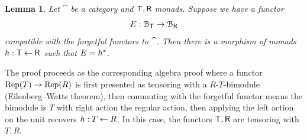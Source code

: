\documentclass[a4paper, reqno]{amsart}
\newtheorem{lemma}[theorem]{Lemma}
\theoremstyle{introTheorems}
\newcommand\Rep{\textup{Rep}}
\renewcommand{\1}{\mathbbold{1}}
\begin{document}
\begin{lemma}\label{lm_monadRestriction}
Let $\cat$ be a category and ${\mathsf{T}},{\mathsf{R}}$ monads. Suppose we have a functor
$$E: \mathcal{B}_{\mathsf{T}}\to \mathcal{B}_{\mathsf{R}}$$
compatible with the forgetful functors to $\cat$. Then there is a morphism of monads $h:{\mathsf{T}}\leftarrow {\mathsf{R}}$ such that $E=h^*$.
\end{lemma}
The proof proceeds as the corresponding algebra proof where a functor $\Rep(T)\to \Rep(R)$ is first presented as tensoring with a $R$-$T$-bimodule (Eilenberg–Watts theorem), then commuting with the forgetful functor means the bimodule is $T$ with right action the regular action, then applying the left action on the unit recovers $h:T\leftarrow R$. In this case, the functors ${\mathsf{T}},{\mathsf{R}}$ are tensoring with $T,R$. 
\end{document}
